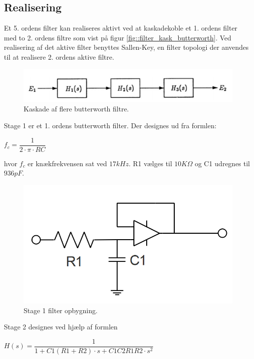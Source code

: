 \subsection{Realisering}
Et 5. ordens filter kan realiseres aktivt ved at kaskadekoble et 1. ordens filter med to 2. ordens filtre som vist på figur  \ref{fig::filter_kask_butterworth}. Ved realisering af det aktive filter benyttes Sallen-Key, en filter topologi der anvendes til at realisere 2. ordens aktive filtre. 
\begin{figure}[h!]
	\centering
	\includegraphics[scale=0.7]{./billeder/Kaskade.png}
	\caption{Kaskade af flere butterworth filtre.}
	\label{fig::kask_butterworth}
\end{figure}
\FloatBlock
Stage 1 er et 1. ordens butterworth filter. Der designes ud fra formlen:\\
\begin{center}
	$f_c = \dfrac{1}{2\cdot\pi\cdot R C}$\\
\end{center} 	
hvor $f_c$ er knækfrekvensen sat ved $17kHz$.
R1 vælges til $10K\Omega$ og C1 udregnes til $936pF$.\\
\begin{figure}[h!]
	\centering
	\includegraphics[scale=0.3]{./billeder/stage1}
	\caption{Stage 1 filter opbygning.}
	\label{fig::stage1}
\end{figure}
\FloatBlock
Stage 2 designes ved hjælp af formlen\\
\begin{center}
\begin{math}
H(s) = \dfrac{1}{1+C1(R1+R2)\cdot s+C1C2R1R2\cdot s^2}
\label{eq::SallenKey}
\end{math}
	
\end{center} 

